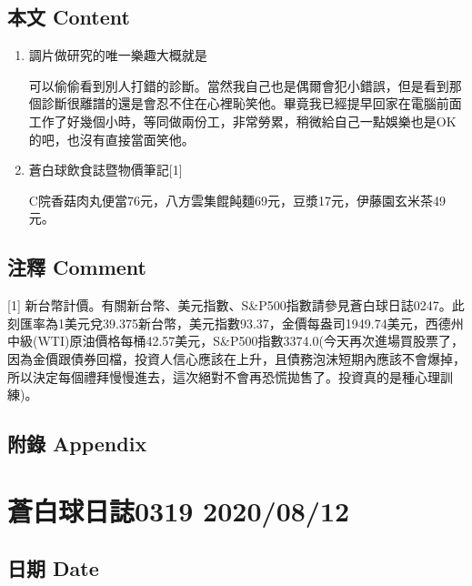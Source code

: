 \documentclass[
]{article}
\begin{document}
\hypertarget{ux672cux6587-content-10}{%
\subsection{本文 Content}\label{ux672cux6587-content-10}}

\begin{enumerate}
\def\labelenumi{\arabic{enumi}.}
\item
  調片做研究的唯一樂趣大概就是

  可以偷偷看到別人打錯的診斷。當然我自己也是偶爾會犯小錯誤，但是看到那個診斷很離譜的還是會忍不住在心裡恥笑他。畢竟我已經提早回家在電腦前面工作了好幾個小時，等同做兩份工，非常勞累，稍微給自己一點娛樂也是OK的吧，也沒有直接當面笑他。
\item
  蒼白球飲食誌暨物價筆記{[}1{]}

  C院香菇肉丸便當76元，八方雲集餛飩麵69元，豆漿17元，伊藤園玄米茶49元。
\end{enumerate}

\hypertarget{ux6ce8ux91cb-comment-10}{%
\subsection{注釋 Comment}\label{ux6ce8ux91cb-comment-10}}

{[}1{]}
新台幣計價。有關新台幣、美元指數、S\&P500指數請參見蒼白球日誌0247。此刻匯率為1美元兌39.375新台幣，美元指數93.37，金價每盎司1949.74美元，西德州中級(WTI)原油價格每桶42.57美元，S\&P500指數3374.0(今天再次進場買股票了，因為金價跟債券回檔，投資人信心應該在上升，且債務泡沫短期內應該不會爆掉，所以決定每個禮拜慢慢進去，這次絕對不會再恐慌拋售了。投資真的是種心理訓練)。

\hypertarget{ux9644ux9304-appendix-10}{%
\subsection{附錄 Appendix}\label{ux9644ux9304-appendix-10}}

\hypertarget{ux84bcux767dux7403ux65e5ux8a8c0319-20200812}{%
\section{蒼白球日誌0319
2020/08/12}\label{ux84bcux767dux7403ux65e5ux8a8c0319-20200812}}

\hypertarget{ux65e5ux671f-date-11}{%
\subsection{日期 Date}\label{ux65e5ux671f-date-11}}
\end{document}
